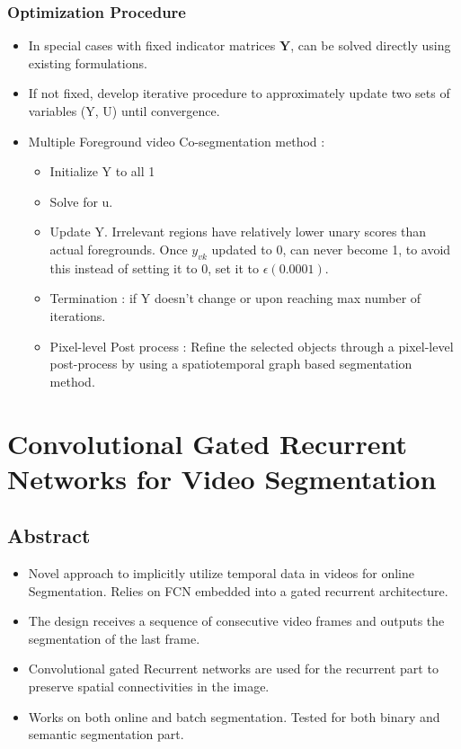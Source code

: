 \documentclass{article}
\begin{document}
\subsubsection{Optimization Procedure}
\begin{itemize}
\item In special cases with fixed indicator matrices $\textbf{Y}$, can be solved directly using existing formulations.
\item If not fixed, develop iterative procedure to approximately update two sets of variables (Y, U) until convergence.
\item Multiple Foreground video Co-segmentation method :
  \begin{itemize}
  \item Initialize Y to all 1
  \item Solve for u.
  \item Update Y. Irrelevant regions have relatively lower unary scores than actual foregrounds. Once $y_{vk}$ updated to 0, can never become 1, to avoid this instead of setting it to 0, set it to $\epsilon (0.0001)$.
  \item Termination : if Y doesn't change or upon reaching max number of iterations.
  \item Pixel-level Post process : Refine the selected objects through a pixel-level post-process by using a spatiotemporal graph based segmentation method.
  \end{itemize}
\end{itemize}


\section{Convolutional Gated Recurrent Networks for Video Segmentation}
\cite{DBLP:journals/corr/SiamVJR16}
\subsection{Abstract}
\begin{itemize}
\item Novel approach to implicitly utilize temporal data in videos for online Segmentation. Relies on FCN embedded into a gated recurrent architecture.
\item The design receives a sequence of consecutive video frames and outputs the segmentation of the last frame.
\item Convolutional gated Recurrent networks are used for the recurrent part to preserve spatial connectivities in the image.
\item Works on both online and batch segmentation. Tested for both binary and semantic segmentation part.
\end{itemize}
\end{document}
